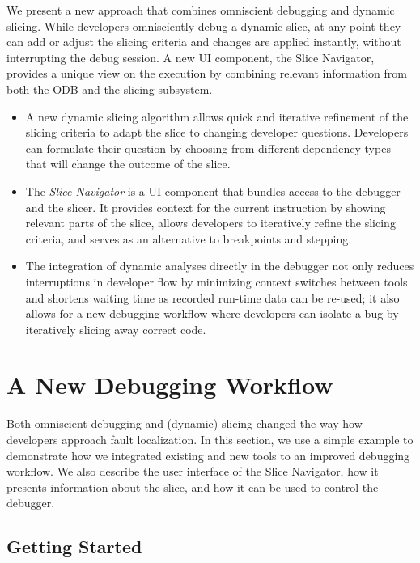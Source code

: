 We present a new approach that combines omniscient debugging and dynamic slicing.
While developers omnisciently debug a dynamic slice, at any point they can add or adjust the slicing criteria and changes are applied instantly, without interrupting the debug session.
A new UI component, the Slice Navigator, provides a unique view on the execution by combining relevant information from both the ODB and the slicing subsystem.

\begin{itemize}
	\item A new dynamic slicing algorithm allows quick and iterative refinement of the slicing criteria to adapt the slice to changing developer questions.
		Developers can formulate their question by choosing from different dependency types that will change the outcome of the slice.
	\item The \emph{Slice Navigator} is a UI component that bundles access to the debugger and the slicer.
		It provides context for the current instruction by showing relevant parts of the slice, allows developers to iteratively refine the slicing criteria, and serves as an alternative to breakpoints and stepping.
	\item The integration of dynamic analyses directly in the debugger not only reduces interruptions in developer flow by minimizing context switches between tools and shortens waiting time as recorded run-time data can be re-used; it also allows for a new debugging workflow where developers can isolate a bug by iteratively slicing away correct code.
\end{itemize}

\section{A New Debugging Workflow}
\label{sec:workflow}

Both omniscient debugging and (dynamic) slicing changed the way how developers approach fault localization.
In this section, we use a simple example to demonstrate how we integrated existing and new tools to an improved debugging workflow.
We also describe the user interface of the Slice Navigator, how it presents information about the slice, and how it can be used to control the debugger.

\subsection{Getting Started}
\label{lst:example}

